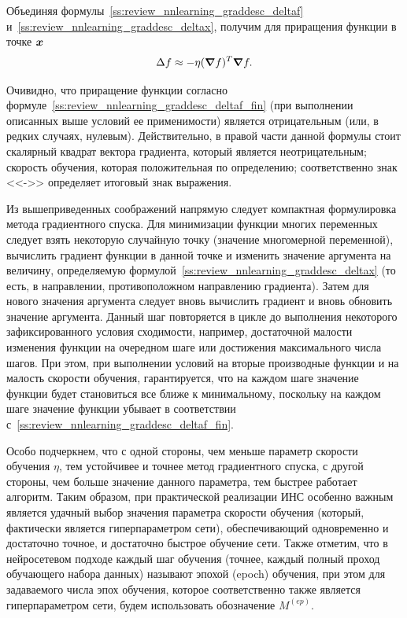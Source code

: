 \documentclass[a4paper,12pt,russian]{article} %
\begin{document}
Объединяя формулы~\eqref{ss:review_nnlearning_graddesc_deltaf} и~\eqref{ss:review_nnlearning_graddesc_deltax}, получим для приращения функции в точке $\bm{x}$
\begin{equation} \label{ss:review_nnlearning_graddesc_deltaf_fin}
	\Delta f  \approx - \eta ( \bm{\nabla} f )^T \bm{\nabla} f.
\end{equation}

Очивидно, что приращение функции согласно формуле~\eqref{ss:review_nnlearning_graddesc_deltaf_fin} (при выполнении описанных выше условий ее применимости) является отрицательным (или, в редких случаях, нулевым).
Действительно, в правой части данной формулы стоит скалярный квадрат вектора градиента, который является неотрицательным; скорость обучения, которая положительная по определению; соответственно знак <<->> определяет итоговый знак выражения.

Из вышеприведенных соображений напрямую следует компактная формулировка метода градиентного спуска.
Для минимизации функции многих переменных следует взять некоторую случайную точку (значение многомерной переменной), вычислить градиент функции в данной точке и изменить значение аргумента на величину, определяемую формулой~\eqref{ss:review_nnlearning_graddesc_deltax} (то есть, в направлении, противоположном направлению градиента).
Затем для нового значения аргумента следует вновь вычислить градиент и вновь обновить значение аргумента.
Данный шаг повторяется в цикле до выполнения некоторого зафиксированного условия сходимости, например, достаточной малости изменения функции на очередном шаге или достижения максимального числа шагов.
При этом, при выполнении условий на вторые производные функции и на малость скорости обучения, гарантируется, что на каждом шаге значение функции будет становиться все ближе к минимальному, поскольку на каждом шаге значение функции убывает в соответствии с~\eqref{ss:review_nnlearning_graddesc_deltaf_fin}.

Особо подчеркнем, что с одной стороны, чем меньше параметр скорости обучения $\eta$, тем устойчивее и точнее метод градиентного спуска, с другой стороны, чем больше значение данного параметра, тем быстрее работает алгоритм.
Таким образом, при практической реализации ИНС особенно важным является удачный выбор значения параметра скорости обучения (который, фактически является гиперпараметром сети), обеспечивающий одновременно и достаточно точное, и достаточно быстрое обучение сети.
Также отметим, что в нейросетевом подходе каждый шаг обучения (точнее, каждый полный проход обучающего набора данных) называют эпохой (epoch) обучения, при этом для задаваемого числа эпох обучения, которое соответственно также является гиперпараметром сети, будем использовать обозначение $M^{(ep)}$.
\end{document}
